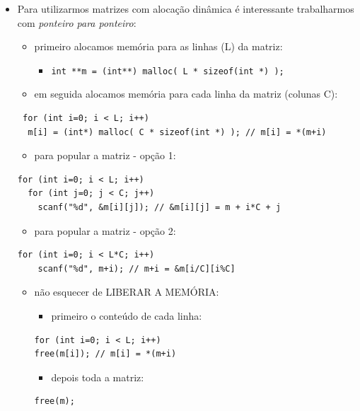 \documentclass[12pt,a4paper]{article}
\providecommand{\tightlist}{%
      \setlength{\itemsep}{0pt}\setlength{\parskip}{0pt}}
\begin{document}
    \begin{itemize}
\tightlist
\item
  Para utilizarmos matrizes com alocação dinâmica é interessante
  trabalharmos com \emph{ponteiro para ponteiro}:

  \begin{itemize}
  \tightlist
  \item
    primeiro alocamos memória para as linhas (L) da matriz:

    \begin{itemize}
    \tightlist
    \item
      \texttt{int\ **m\ =\ (int**)\ malloc(\ L\ *\ sizeof(int\ *)\ );}
    \end{itemize}
  \item
    em seguida alocamos memória para cada linha da matriz (colunas C):
  \end{itemize}

\begin{verbatim}
 for (int i=0; i < L; i++) 
  m[i] = (int*) malloc( C * sizeof(int *) ); // m[i] = *(m+i)
\end{verbatim}

  \begin{itemize}
  \tightlist
  \item
    para popular a matriz - opção 1:
  \end{itemize}

\begin{verbatim}
for (int i=0; i < L; i++) 
  for (int j=0; j < C; j++) 
    scanf("%d", &m[i][j]); // &m[i][j] = m + i*C + j
\end{verbatim}

  \begin{itemize}
  \tightlist
  \item
    para popular a matriz - opção 2:
  \end{itemize}

\begin{verbatim}
for (int i=0; i < L*C; i++) 
    scanf("%d", m+i); // m+i = &m[i/C][i%C]
\end{verbatim}

  \begin{itemize}
  \tightlist
  \item
    não esquecer de LIBERAR A MEMÓRIA:

    \begin{itemize}
    \tightlist
    \item
      primeiro o conteúdo de cada linha:
    \end{itemize}

\begin{verbatim}
for (int i=0; i < L; i++) 
free(m[i]); // m[i] = *(m+i)
\end{verbatim}

    \begin{itemize}
    \tightlist
    \item
      depois toda a matriz:
    \end{itemize}

\begin{verbatim}
free(m);
\end{verbatim}
  \end{itemize}
\end{itemize}
\end{document}
